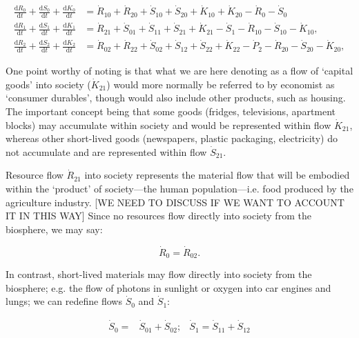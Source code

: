 \begin{align} \label{eq:B_CV_0_to_2}
	\frac{\mathrm{d}R_{0}}{\mathrm{d}t} 
	+ \frac{\mathrm{d}S_{0}}{\mathrm{d}t}	
	+ \frac{\mathrm{d}K_0}{\mathrm{d}t}		&
	=  \dot{R}_{10} + \dot{R}_{20} 
	+ \dot{S}_{10} + \dot{S}_{20} 
	+ \dot{K}_{10} + \dot{K}_{20} 
	- \dot{R}_{0} 
	- \dot{S}_{0} 							\\
	\frac{\mathrm{d}R_{1}}{\mathrm{d}t} 
	+ \frac{\mathrm{d}S_{1}}{\mathrm{d}t}	
	+ \frac{\mathrm{d}K_{1}}{\mathrm{d}t}	&
	=  \dot{R}_{21} 
	+ \dot{S}_{01} 
	+ \dot{S}_{11} 
	+ \dot{S}_{21}
	+ \dot{K}_{21}
	- \dot{S}_{1} 
	- \dot{R}_{10} 
	- \dot{S}_{10} 
	- \dot{K}_{10},							\\
	\frac{\mathrm{d}R_{2}}{\mathrm{d}t} 
	+ \frac{\mathrm{d}S_{2}}{\mathrm{d}t}
	+ \frac{\mathrm{d}K_{2}}{\mathrm{d}t}	&
	=  \dot{R}_{02} 
	+ \dot{R}_{22} 
	+ \dot{S}_{02} 
	+ \dot{S}_{12} 
	+ \dot{S}_{22} 
	+ \dot{K}_{22}
	- \dot{P}_{2}
	- \dot{R}_{20} 
	- \dot{S}_{20} 
	- \dot{K}_{20},
\end{align}

One point worthy of noting is that what we are here denoting as a flow of `capital goods'
into society ($\dot{K}_{21}$) would more normally be referred to by economist as `consumer
durables', though would also include other products, such as housing. The important concept
being that some goods (fridges, televisions, apartment blocks) may accumulate within society
and would be represented within flow $\dot{K}_{21}$, whereas other short-lived goods
(newspapers, plastic packaging, electricity) do not accumulate and are represented within
flow $\dot{S}_{21}$.

Resource flow $\dot{R}_{21}$ into society represents the material flow that will be embodied
within the `product' of society---the human population---i.e. food produced by the agriculture
industry. [WE NEED TO DISCUSS IF WE WANT TO ACCOUNT IT IN THIS WAY]
Since no resources flow directly into society from the biosphere, we may say:

\begin{equation}
	\dot{R}_{0} = \dot{R}_{02}.
\end{equation}

In contrast, short-lived materials may flow directly into society from the biosphere; e.g. the
flow of photons in sunlight or oxygen into car engines and lungs; we can redefine flows
$\dot{S}_{0}$ and $\dot{S}_{1}$:

\begin{align}\label{eq:B_S_def}
	\dot{S}_{0} = 
	& \dot{S}_{01} + \dot{S}_{02};
	& \dot{S}_{1} = 
	\dot{S}_{11} + \dot{S}_{12}
\end{align}

